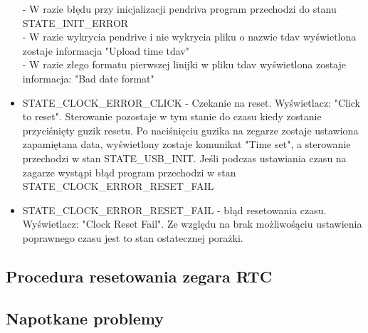 \documentclass[declaration,shortabstract, mgr]{iithesis}
\begin{document}
\begin{itemize}
- W razie błędu przy inicjalizacji pendriva program przechodzi do stanu STATE\_INIT\_ERROR \\
- W razie wykrycia pendrive i nie wykrycia pliku o nazwie tdav wyświetlona zostaje informacja "Upload time tdav"\\
- W razie złego formatu pierwszej linijki w pliku tdav wyświetlona zostaje informacja: "Bad date format"
\item STATE\_CLOCK\_ERROR\_CLICK - Czekanie na reset. Wyświetlacz: "Click to reset".  Sterowanie pozostaje w tym stanie do czasu kiedy zostanie przyciśnięty guzik resetu. Po naciśnięciu guzika na zegarze zostaje ustawiona zapamiętana data, wyświetlony zostaje komunikat "Time set", a sterowanie przechodzi w stan STATE\_USB\_INIT. Jeśli podczas ustawiania czasu na zagarze wystąpi błąd program przechodzi w stan STATE\_CLOCK\_ERROR\_RESET\_FAIL \\
\item STATE\_CLOCK\_ERROR\_RESET\_FAIL - błąd resetowania czasu. Wyświetlacz: "Clock Reset Fail". Ze względu na brak możliwośąciu ustawienia poprawnego czasu jest to stan ostatecznej porażki.
\end{itemize}
\subsection{Procedura resetowania zegara RTC}

\subsection{Napotkane problemy}
\end{document}
